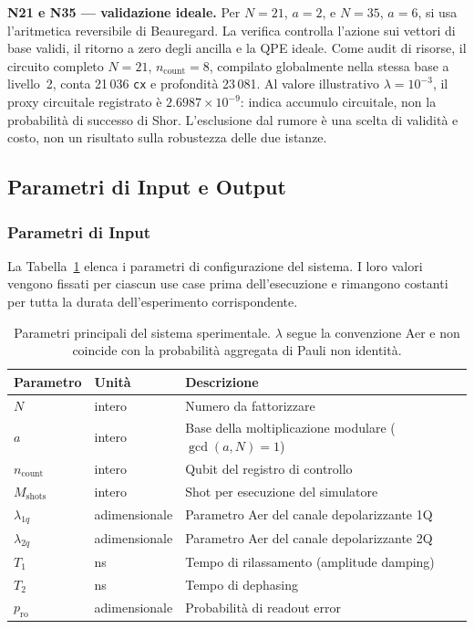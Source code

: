 \begin{onehalfspace}
\textbf{N21 e N35 --- validazione ideale.} Per $N=21$, $a=2$, e $N=35$, $a=6$, si usa l'aritmetica reversibile di Beauregard. La verifica controlla l'azione sui vettori di base validi, il ritorno a zero degli ancilla e la QPE ideale. Come audit di risorse, il circuito completo $N=21$, $n_{\text{count}}=8$, compilato globalmente nella stessa base a livello~2, conta 21\,036 \texttt{cx} e profondità 23\,081. Al valore illustrativo $\lambda=10^{-3}$, il proxy circuitale registrato è $2.6987\times10^{-9}$: indica accumulo circuitale, non la probabilità di successo di Shor. L'esclusione dal rumore è una scelta di validità e costo, non un risultato sulla robustezza delle due istanze.

\subsection{Parametri di Input e Output}
\label{sec:input_output}

\subsubsection{Parametri di Input}

La Tabella~\ref{tab:input_params} elenca i parametri di configurazione del sistema. I loro valori vengono fissati per ciascun use case prima dell'esecuzione e rimangono costanti per tutta la durata dell'esperimento corrispondente.

\begin{table}[H]
\centering
\small
\begin{tabular}{@{}lll@{}}
\toprule
\textbf{Parametro}  & \textbf{Unità} & \textbf{Descrizione} \\
\midrule
$N$                 & intero         & Numero da fattorizzare \\
$a$                 & intero         & Base della moltiplicazione modulare ($\gcd(a,N)=1$) \\
$n_{\text{count}}$  & intero         & Qubit del registro di controllo \\
$M_{\text{shots}}$  & intero         & Shot per esecuzione del simulatore \\
$\lambda_{1q}$      & adimensionale  & Parametro Aer del canale depolarizzante 1Q \\
$\lambda_{2q}$      & adimensionale  & Parametro Aer del canale depolarizzante 2Q \\
$T_1$               & ns             & Tempo di rilassamento (amplitude damping) \\
$T_2$               & ns             & Tempo di dephasing \\
$p_{\text{ro}}$     & adimensionale  & Probabilità di readout error \\
\bottomrule
\end{tabular}
\caption{Parametri principali del sistema sperimentale. $\lambda$ segue la convenzione Aer e non coincide con la probabilità aggregata di Pauli non identità.}
\label{tab:input_params}
\end{table}


\end{onehalfspace}

